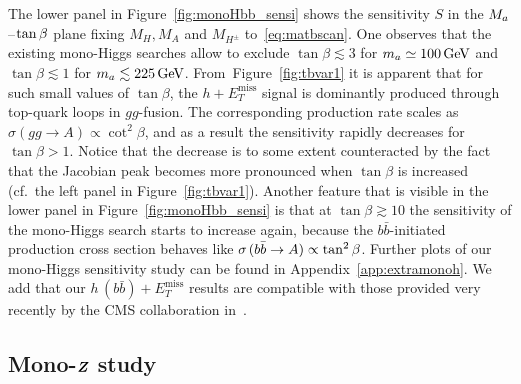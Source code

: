 \documentclass[a4paper, 11pt,notoc]{article}
\newcommand{\MET}{\ensuremath{E_T^\mathrm{miss}}\xspace}
\newcommand{\mA}{\ensuremath{M_{A}}\xspace}
\newcommand{\ma}{\ensuremath{M_{a}}\xspace}
\newcommand{\mH}{\ensuremath{M_{H}}\xspace}
\newcommand{\mHc}{\ensuremath{M_{H^{\pm}}}\xspace}
\def\bm#1{\mbox{\boldmath$#1$\unboldmath}}
\begin{document}
The lower panel in Figure~\ref{fig:monoHbb_sensi} shows the sensitivity $S$ in the $\ma\hspace{0.25mm}$--$\hspace{0.25mm}\tan \beta$ plane fixing  $\mH, \mA$ and  $\mHc$ to~\eqref{eq:matbscan}. One observes that the existing mono-Higgs searches allow to exclude $\tan \beta \lesssim 3$ for $m_a \simeq 100 \, {\rm GeV}$ and $\tan \beta \lesssim 1$ for $m_a \lesssim 225 \, {\rm GeV}$. From~Figure~\ref{fig:tbvar1} it is apparent that for such small values of $\tan \beta$, the $h + \MET$ signal is dominantly produced through top-quark loops in $gg$-fusion. The corresponding production rate scales as $\sigma \left ( gg \to A \right ) \propto \cot^2 \beta$, and as a result the sensitivity rapidly decreases for $\tan \beta > 1$. Notice that the decrease is to some extent counteracted by the fact that the Jacobian peak becomes more pronounced when  $\tan \beta$ is increased (cf.~the left panel in Figure~\ref{fig:tbvar1}). Another feature that is visible in the  lower panel in Figure~\ref{fig:monoHbb_sensi}  is that at $\tan \beta \gtrsim 10$ the sensitivity of the mono-Higgs search  starts to increase again, because the $b \bar b$-initiated production cross section behaves like $\sigma \hspace{0.5mm} ( b \bar b \to A  ) \propto \tan^2 \beta$. Further plots of our mono-Higgs sensitivity study can be found in Appendix~\ref{app:extramonoh}. {\color{green} We add that our $h \, (b \bar b) + \MET$ results are compatible with those provided very recently by the CMS collaboration in~\cite{CMS-PAS-EXO-16-050}. }

\subsection[Mono-$Z$ study]{Mono-$\bm{Z}$ study}
\label{sec:sensi_monozll}
\end{document}
